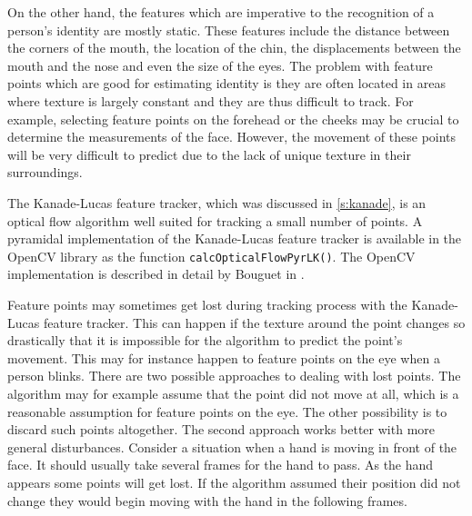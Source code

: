 \documentclass[11pt,a4paper,twoside]{report}
\begin{document}
On the other hand, the features which are imperative to the recognition of a
person's identity are mostly static. These features include the distance between the
corners of the mouth, the location of the chin, the displacements between
the mouth and the nose and even the size of the eyes. The problem with feature
points which are good for estimating identity is they are often located in areas
where texture is largely constant and they are thus difficult to track. For example, selecting
feature points on the forehead or the cheeks may be crucial to determine the
measurements of the face. However, the movement of these points will be very
difficult to predict due to the lack of unique texture in their surroundings.

The Kanade-Lucas feature tracker, which was discussed in \ref{s:kanade}, is an
optical flow algorithm well suited for tracking a small number of points. A
pyramidal implementation of the Kanade-Lucas feature tracker is available in the
OpenCV library as the function \texttt{calcOpticalFlowPyrLK()}. The OpenCV
implementation is described in detail by Bouguet in \cite{kanade4}.  

Feature points may sometimes get lost during tracking process with the Kanade-Lucas
feature tracker. This can happen if the
texture around the point changes so drastically that it is impossible for the
algorithm to predict the point's movement. This may for instance happen to feature points
on the eye when a person blinks. There are two possible approaches to dealing
with lost points. The algorithm may for example assume that the point did not move at
all, which is a reasonable assumption for feature points on the eye. The other
possibility is to discard such points altogether. The second approach works
better with more general disturbances. Consider a situation when a hand is moving
in front of the face. It should usually take several frames for the hand to
pass. As the hand appears some points will get lost. If the algorithm assumed
their position did not change they would begin moving with the hand in the
following frames.
\end{document}
